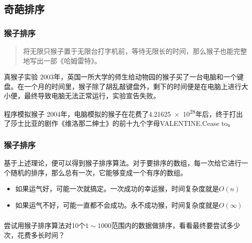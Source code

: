 \subsection{奇葩排序}


\begin{frame}
    \frametitle{猴子排序}
    \begin{quote}
        将无限只猴子置于无限台打字机前，等待无限长的时间，那么猴子也能完整地写出一部《哈姆雷特》。

    \end{quote}
    \vspace{-10pt}
\begin{block}{真猴子实验}
    2003年，英国一所大学的师生给动物园的猴子买了一台电脑和一个键盘。在一个月的时间里，猴子除了胡乱敲键盘外，剩下的时间便是在电脑上进行大小便，最终导致电脑无法正常运行，实验宣告失败。
\end{block}

\begin{block}{程序模拟猴子}
    2004年，电脑模拟的猴子在花费了\num{4.21625e28}年后，终于打出了莎士比亚的剧作《维洛那二绅士》的前十九个字母VALENTINE.Cease to。
\end{block}

\end{frame}


\begin{frame}
    \frametitle{猴子排序}
    基于上述理论，便可以得到猴子排序算法。对于要排序的数组，每一次给它进行一个随机的排序，那么总有一次，它能够变成一个有序的数组。
    \begin{itemize}
      \item 如果运气好，可能一次就搞定。一次成功的幸运猴，时间复杂度就是$O(n)$
      \item 如果运气不好，可能一直都不会成功。永不成功猴，时间复杂度就是$O(\infty)$
    \end{itemize}

        \frametitle{}
        \begin{example}
            尝试用猴子排序算法对10个$1\sim 1000$范围内的数据做排序，看看最终要尝试多少次，花费多长时间？
        \end{example}
\end{frame}


